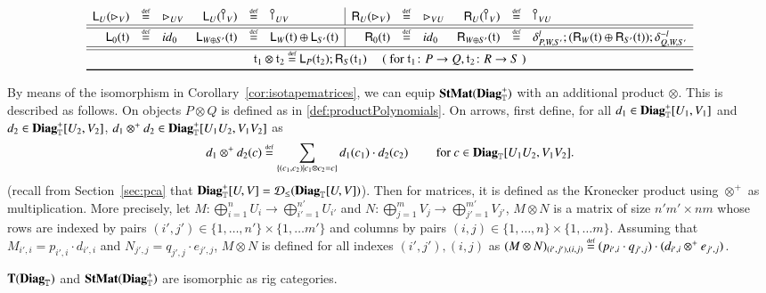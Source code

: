 \begin{table}[t]
\begin{center}
{{\[\begin{array}{c}
\begin{array}{rclrcl|rclrcl}
            \LW U {\codiag V} &\defeq& \codiag{UV} &  \LW U {\cobang V} &\defeq& \cobang{UV}& \RW U {\codiag V} &\defeq& \codiag{VU} & \RW U {\cobang V} &\defeq& \cobang{VU} \\
            \hline \hline
            \LW{\zero}{\t} &\defeq& \id{\zero} &  \LW{W\piu S'}{\t} &\defeq& \LW{W}{\t} \piu \LW{S'}{\t} & \RW{\zero}{\t} &\defeq& \id{\zero} &
            \RW{W \piu S'}{\t} &\defeq& \dl{P}{W}{S'} ; (\RW{W}{\t} \piu \RW{S'}{\t}) ; \Idl{Q}{W}{S'} \\
            \hline \hline
            \multicolumn{12}{c}{
                \t_1 \per \t_2 \defeq \LW{P}{\t_2} ; \RW{S}{\t_1}   \quad \text{ ( for }\t_1 \colon P \to Q, \t_2 \colon R \to S   \text{ )}
            }
            \\
            \bottomrule
        \end{array}
    \end{array}        
      \]
      }
      \hfill
      \caption{Inductive definitions of  left distributor $\dl{P}{Q}{R}$ and $\otimes$-symmetry $\symmt{P}{Q}$ (top); monomial and polynomial whiskerings (center); definition of $\per$ (bottom).}\label{tab:producttape}
       }
    \end{center}
\end{table}


By means of the isomorphism in Corollary~\ref{cor:isotapematrices}, we can equip $\mathbf{StMat}(\mathbf{Diag}_{\mathbb{T}}^+)$ with an additional product $\otimes$. This is described as follows. On objects $P\otimes Q$ is defined as in \eqref{def:productPolynomials}. On arrows, first define, for all $d_1\in \mathbf{Diag}_{\mathbb{T}}^+[U_1,V_1]$ and $d_2\in \mathbf{Diag}_{\mathbb{T}}^+[U_2,V_2]$,  $d_1\otimes^+d_2 \in \mathbf{Diag}_{\mathbb{T}}^+[U_1U_2,V_1V_2]$ as
\[d_1\otimes^+ d_2 (c) \stackrel{\text{\tiny def}}{=} \sum_{\{(c_1,c_2) \mid c_1\otimes c_2 =c\}} d_1(c_1)\cdot d_2(c_2) \qquad \text{ for }c\in \mathbf{Diag}_{\mathbb{T}}[U_1U_2,V_1V_2]\text{.}\]
(recall from Section~\ref{sec:pca} that $ \mathbf{Diag}_{\mathbb{T}}^+[U,V]=\mathcal{D}_{\leq}(\mathbf{Diag}_{\mathbb{T}}[U,V])$). Then for matrices, it is defined as the Kronecker product using $\otimes^+$ as multiplication. 
More precisely, let $M\colon\bigoplus_{i=1}^nU_i \to \bigoplus_{i'=1}^{n'}U_{i'}$ and $N\colon\bigoplus_{j=1}^m V_j \to \bigoplus_{j'=1}^{m'} V_{j'}$, $M\otimes N$ is a matrix of size $n'm'\times nm$ whose rows are indexed by pairs $(i',j')\in \{1,\dots, n'\}\times \{1,\dots m'\}$ and columns by pairs $(i,j)\in \{1,\dots, n\}\times \{1,\dots m\}$. Assuming that $M_{i',i}=p_{i',i} \cdot d_{i',i}$
and $N_{j',j}=q_{j',j} \cdot e_{j',j}$, $M\otimes N$ is defined for all indexes $(i',j'),(i,j)$ as
$(M\otimes N)_{(i',j'),(i,j)} \stackrel{\text{\tiny def}}{=} (p_{i',i}\cdot q_{j',j}) \cdot (d_{i',i}\otimes^+ e_{j',j}) $.
%
\begin{corollary}
$\mathbf{T}(\mathbf{Diag}_{\mathbb{T}})$ and $\mathbf{StMat}(\mathbf{Diag}_{\mathbb{T}}^+)$ are isomorphic as rig categories.
\end{corollary}




